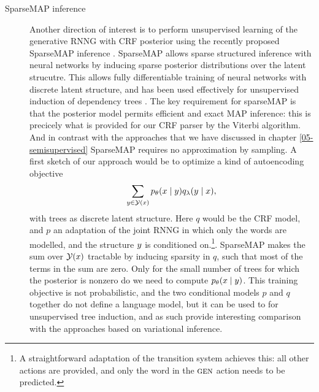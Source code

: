 \begin{description}
    \item[SparseMAP inference]
      Another direction of interest is to perform unsupervised learning of the generative RNNG with CRF posterior using the recently proposed SparseMAP inference \citep{niculae2018sparsemap}. SparseMAP allows sparse structured inference with neural networks by inducing sparse posterior distributions over the latent strucutre. This allows fully differentiable training of neural networks with discrete latent structure, and has been used effectively for unsupervised induction of dependency trees \citep{niculae2018towards}. The key requirement for sparseMAP is that the posterior model permits efficient and exact MAP inference: this is precicely what is provided for our CRF parser by the Viterbi algorithm. And in contrast with the approaches that we have discussed in chapter \ref{05-semisupervised} SparseMAP requires no approximation by sampling. A first sketch of our approach would be to optimize a kind of autoencoding objective
      \begin{align*}
        \sum_{ y \in \mathcal{Y}(x) } p_{\theta}(x \mid y) q_{\lambda}( y \mid x ),
      \end{align*}
      with trees as discrete latent structure. Here $q$ would be the CRF model, and $p$ an adaptation of the joint RNNG in which only the words are modelled, and the structure $y$ is conditioned on.\footnote{A straightforward adaptation of the transition system achieves this: all other actions are provided, and only the word in the $\textsc{gen}$ action needs to be predicted.}. SparseMAP makes the sum over $\mathcal{Y}(x)$ tractable by inducing sparsity in $q$, such that most of the terms in the sum are zero. Only for the small number of trees for which the posterior is nonzero do we need to compute $p_{\theta}(x \mid y)$. This training objective is not probabilistic, and the two conditional models $p$ and $q$ together do not define a language model, but it can be used to for unsupervised tree induction, and as such provide interesting comparison with the approaches based on variational inference.

    \end{description}
